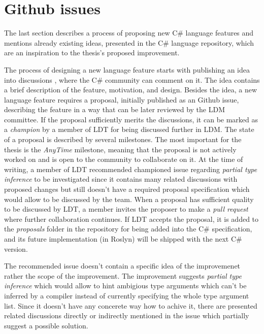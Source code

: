 \section{Github issues}

The last section describes a process of proposing new C\# language features and mentions already existing ideas, presented in the C\# language repository, which are an inspiration to the thesis's proposed improvement.
\par
The process of designing a new language feature starts with publishing an idea into discussions \cite{online:discussions}, where the C\# community can comment on it. 
The idea contains a brief description of the feature, motivation, and design. 
Besides the idea, a new language feature requires a proposal, initially published as an Github issue, describing the feature in a way that can be later reviewed by the \ac{LDM} committee.
If the proposal sufficiently merits the discussions, it can be marked as a \textit{champion} by a member of \ac{LDT} for being discussed further in \ac{LDM}. 
The state of a proposal is described by several milestones. 
The most important for the thesis is the \textit{AnyTime} milestone, meaning that the proposal is not actively worked on and is open to the community to collaborate on it. 
At the time of writing, a member of \ac{LDT} recommended championed issue \cite{online:champion} regarding \textit{partial type inference} to be investigated since it contains many related discussions with proposed changes but still doesn’t have a required proposal specification which would allow to be discussed by the team. 
When a proposal has sufficient quality to be discussed by \ac{LDT}, a member invites the proposer to make a \textit{pull request} where further collaboration continues. 
If \ac{LDT} accepts the proposal, it is added to the \textit{proposals} folder in the repository for being added into the C\# specification, and its future implementation (in Roslyn) will be shipped with the next C\# version. 
\par
The recommended issue doesn't contain a specific idea of the improvemenet rather the scope of the improvement.
The improvement suggests \textit{partial type inference} which would allow to hint ambigious type arguments which can't be inferred by a compiler instead of currently specifying the whole type argument list.
Since it doesn't have any concerete way how to achive it, there are presented related discussions directly or indirectly mentioned in the issue which partially suggest a possible solution.

